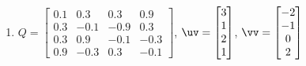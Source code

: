 \begin{exercise}
\begin{enumerate}
\item \(Q=\begin{bmatrix} 0.1&0.3&0.3&0.9
\\0.3&-0.1&-0.9&0.3
\\0.3&0.9&-0.1&-0.3
\\0.9&-0.3&0.3&-0.1 \end{bmatrix}\), 
\(\uv=\begin{bmatrix} 3\\1\\2\\1 \end{bmatrix}\),
\(\vv=\begin{bmatrix} -2\\-1\\0\\2 \end{bmatrix}\)

\end{enumerate}
\end{exercise}



